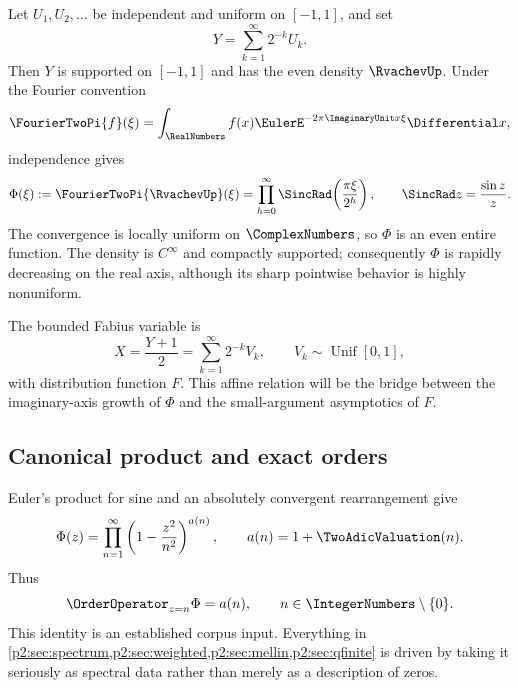 \documentclass[11pt]{article}
\numberwithin{equation}{section}
\theoremstyle{definition}
\theoremstyle{remark}
\begin{document}
Let $U_1,U_2,\ldots$ be independent and uniform on $[-1,1]$, and set
\begin{equation}
 Y=\sum_{k=1}^{\infty}2^{-k}U_k.                    \label{p2:eq:Y}
\end{equation}
Then $Y$ is supported on $[-1,1]$ and has the even density $\RvachevUp$.  Under the
Fourier convention
\begin{equation}
 \FourierTwoPi{f}(\xi)=\int_{\RealNumbers}f(x)\EulerE^{-2\pi\ImaginaryUnit x\xi}\Differential x,      \label{p2:eq:fourier-conv}
\end{equation}
independence gives
\begin{equation}
 \Phi(\xi):=\FourierTwoPi{\RvachevUp}(\xi)
 =\prod_{h=0}^{\infty}\SincRad\!\left(\frac{\pi\xi}{2^h}\right),
 \qquad \SincRad z=\frac{\sin z}{z}.                          \label{p2:eq:Phi-sinc}
\end{equation}
The convergence is locally uniform on $\ComplexNumbers$, so $\Phi$ is an even entire function.
The density is $C^\infty$ and compactly supported; consequently $\Phi$ is rapidly
decreasing on the real axis, although its sharp pointwise behavior is highly
nonuniform.

The bounded Fabius variable is
\begin{equation}
 X=\frac{Y+1}{2}=\sum_{k=1}^{\infty}2^{-k}V_k,
 \qquad V_k\sim\operatorname{Unif}[0,1],                  \label{p2:eq:X}
\end{equation}
with distribution function $F$.  This affine relation will be the bridge between
the imaginary-axis growth of $\Phi$ and the small-argument asymptotics of $F$.

\subsection{Canonical product and exact orders}

Euler's product for sine and an absolutely convergent rearrangement give
\begin{equation}
 \Phi(z)=\prod_{n=1}^{\infty}
 \left(1-\frac{z^2}{n^2}\right)^{a(n)},
 \qquad a(n)=1+\TwoAdicValuation(n).                                  \label{p2:eq:canonical}
\end{equation}
Thus
\begin{equation}
 \OrderOperator_{z=n}\Phi=a(n),\qquad n\in\IntegerNumbers\setminus\{0\}.          \label{p2:eq:zero-order}
\end{equation}
This identity is an established corpus input.  Everything in
\cref{p2:sec:spectrum,p2:sec:weighted,p2:sec:mellin,p2:sec:qfinite} is driven by taking it
seriously as spectral data rather than merely as a description of zeros.
\end{document}
